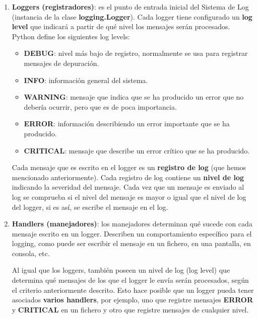     \begin{enumerate}
        \item \textbf{Loggers (registradores)}: es el punto de entrada inicial del Sistema
        de Log (instancia de la clase \textbf{logging.Logger}). Cada logger tiene
        configurado un \textbf{log level} que indicará a partir de qué nivel los mensajes
        serán procesados. Python define los siguientes log levels:

            \begin{itemize}
                \item \textbf{DEBUG}: nivel más bajo de registro, normalmente se usa para
                registrar mensajes de depuración.
                \item \textbf{INFO}: información general del sistema.
                \item \textbf{WARNING}: mensaje que indica que se ha producido un error
                que no debería ocurrir, pero que es de poca importancia.
                \item \textbf{ERROR}: información describiendo un error importante que se
                ha producido.
                \item \textbf{CRITICAL}: mensaje que describe un error crítico que se
                ha producido.
            \end{itemize}

        Cada mensaje que es escrito en el logger es un \textbf{registro de log} (que hemos
        mencionado anteriormente). Cada registro de log contiene un \textbf{nivel de log}
        indicando la severidad del mensaje. Cada vez que un mensaje es enviado al log se
        comprueba si el nivel del mensaje es mayor o igual que el nivel de log del logger,
        si es así, se escribe el mensaje en el log.

        \item \textbf{Handlers (manejadores)}: los manejadores determinan qué sucede con
        cada mensaje escrito en un logger. Describen un comportamiento específico para
        el logging, como puede ser escribir el mensaje en un fichero, en una pantalla,
        en consola, etc.

        Al igual que los loggers, también poseen un nivel de log (log level) que determina
        qué mensajes de los que el logger le envía serán procesados, según el criterio
        anteriormente descrito. Esto hace posible que un logger pueda tener asociados
        \textbf{varios handlers}, por ejemplo, uno que registre mensajes \textbf{ERROR} y
        \textbf{CRITICAL} en un fichero y otro que registre mensajes de cualquier nivel.


\end{enumerate}
